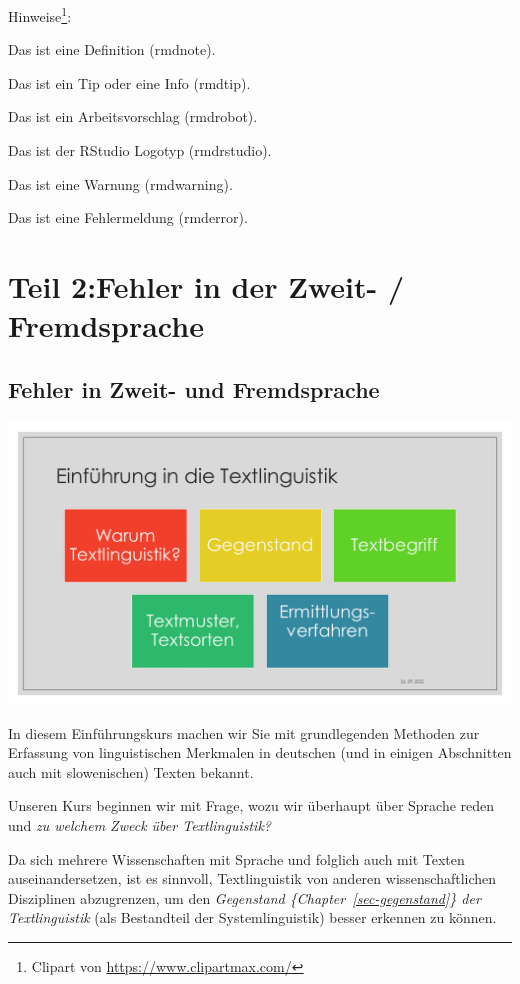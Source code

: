 \documentclass[
  letterpaper,
]{scrbook}
\begin{document}
Hinweise\footnote{Clipart von \url{https://www.clipartmax.com/}}:

Das ist eine Definition (rmdnote).

Das ist ein Tip oder eine Info (rmdtip).

Das ist ein Arbeitsvorschlag (rmdrobot).

Das ist der RStudio Logotyp (rmdrstudio).

Das ist eine Warnung (rmdwarning).

Das ist eine Fehlermeldung (rmderror).

\part{Teil 2:Fehler in der Zweit- / Fremdsprache}

\hypertarget{sec-l2_fehler}{%
\chapter{Fehler in Zweit- und Fremdsprache}\label{sec-l2_fehler}}

\includegraphics[width=1\textwidth,height=\textheight]{./pictures/Diapozitiv5.PNG}

In diesem Einführungskurs machen wir Sie mit grundlegenden Methoden zur
Erfassung von linguistischen Merkmalen in deutschen (und in einigen
Abschnitten auch mit slowenischen) Texten bekannt.

Unseren Kurs beginnen wir mit Frage, wozu wir überhaupt über Sprache
reden und \emph{zu welchem Zweck über Textlinguistik?}

Da sich mehrere Wissenschaften mit Sprache und folglich auch mit Texten
auseinandersetzen, ist es sinnvoll, Textlinguistik von anderen
wissenschaftlichen Disziplinen abzugrenzen, um den \emph{Gegenstand
\{Chapter~\ref{sec-gegenstand}\} der Textlinguistik} (als Bestandteil
der Systemlinguistik) besser erkennen zu können.
\end{document}
